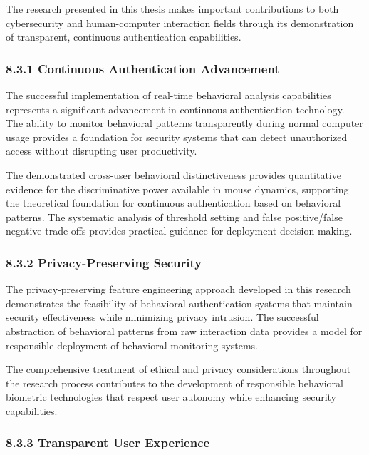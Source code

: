 \documentclass[
  11pt,
  a4paper,
]{article}
\begin{document}
The research presented in this thesis makes important contributions to
both cybersecurity and human-computer interaction fields through its
demonstration of transparent, continuous authentication capabilities.

\subsubsection{8.3.1 Continuous Authentication
Advancement}\label{continuous-authentication-advancement}

The successful implementation of real-time behavioral analysis
capabilities represents a significant advancement in continuous
authentication technology. The ability to monitor behavioral patterns
transparently during normal computer usage provides a foundation for
security systems that can detect unauthorized access without disrupting
user productivity.

The demonstrated cross-user behavioral distinctiveness provides
quantitative evidence for the discriminative power available in mouse
dynamics, supporting the theoretical foundation for continuous
authentication based on behavioral patterns. The systematic analysis of
threshold setting and false positive/false negative trade-offs provides
practical guidance for deployment decision-making.

\subsubsection{8.3.2 Privacy-Preserving
Security}\label{privacy-preserving-security}

The privacy-preserving feature engineering approach developed in this
research demonstrates the feasibility of behavioral authentication
systems that maintain security effectiveness while minimizing privacy
intrusion. The successful abstraction of behavioral patterns from raw
interaction data provides a model for responsible deployment of
behavioral monitoring systems.

The comprehensive treatment of ethical and privacy considerations
throughout the research process contributes to the development of
responsible behavioral biometric technologies that respect user autonomy
while enhancing security capabilities.

\subsubsection{8.3.3 Transparent User
Experience}\label{transparent-user-experience}
\end{document}
